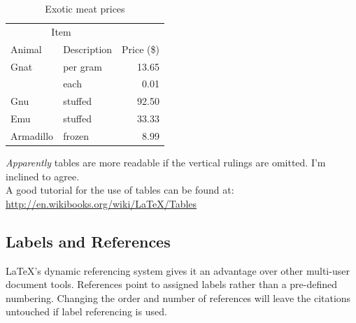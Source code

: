 \documentclass[12pt]{article}
\begin{document}
\begin{table}[h]			%
	\centering
	\begin{tabular}{llr}	%

		\hline		%
		
		\multicolumn{2}{c}{Item} \\		%
								
		\cline{1-2}		%
		
			Animal   	& Description 	& Price (\$) \\	%
		\hline
			Gnat		& per gram	& 13.65      \\
				        & each       	& 0.01       \\
			Gnu		& stuffed     	& 92.50      \\
			Emu		& stuffed		& 33.33      \\
			Armadillo	& frozen		& 8.99       \\
		\hline
	\end{tabular}
	\caption{Exotic meat prices}
	\label{table:meats}
\end{table}
\textit{Apparently} tables are more readable if the vertical rulings are omitted. I'm inclined to agree.\\
A good tutorial for the use of tables can be found at: \url{http://en.wikibooks.org/wiki/LaTeX/Tables}

\subsection{Labels and References}\label{sec:labels_and_refs}
LaTeX's dynamic referencing system gives it an advantage over other multi-user document tools. References point to assigned labels rather than a pre-defined numbering. Changing the order and number of references will leave the citations untouched if label referencing is used.
\end{document}
